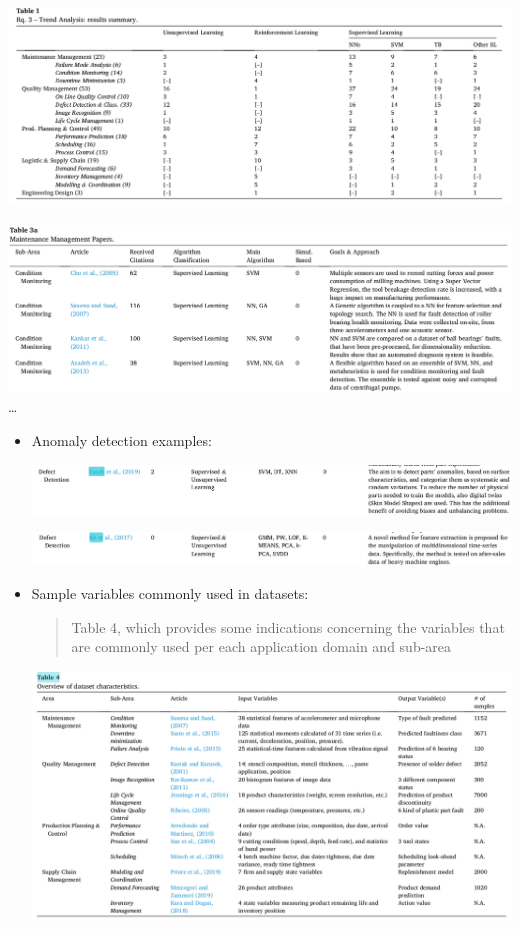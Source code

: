 \documentclass[
  letterpaper,
  DIV=11,
  numbers=noendperiod]{scrartcl}
\begin{document}
\includegraphics{img/2023-01-07-12-32-41.png}

\includegraphics{img/2023-01-07-12-38-32.png} \ldots{}

\begin{itemize}
\item
  Anomaly detection examples:

  \includegraphics{img/2023-01-07-12-48-20.png}

  \includegraphics{img/2023-01-07-12-49-39.png}
\item
  Sample variables commonly used in datasets:

  \begin{quote}
  Table 4, which provides some indications concerning the variables that
  are commonly used per each application domain and sub-area
  \end{quote}

  \includegraphics{img/2023-01-07-12-53-08.png}
\end{itemize}
\end{document}
